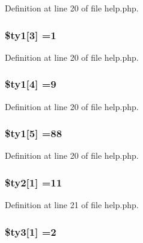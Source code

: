 Definition at line 20 of file help.\+php.

\hypertarget{help_8php_ad18d4358b281e06cd618cfb90f9d8fe3}{
\subsubsection[{\$ty1}]{\setlength{\rightskip}{0pt plus 5cm}\$ty1\mbox{[}3\mbox{]} =1}}\label{help_8php_ad18d4358b281e06cd618cfb90f9d8fe3}


Definition at line 20 of file help.\+php.

\hypertarget{help_8php_af76e33f9212a07c65cf094d63e549fad}{
\subsubsection[{\$ty1}]{\setlength{\rightskip}{0pt plus 5cm}\$ty1\mbox{[}4\mbox{]} =9}}\label{help_8php_af76e33f9212a07c65cf094d63e549fad}


Definition at line 20 of file help.\+php.

\hypertarget{help_8php_a2051398f6d528e7c7b22d89a4c2ae2f3}{
\subsubsection[{\$ty1}]{\setlength{\rightskip}{0pt plus 5cm}\$ty1\mbox{[}5\mbox{]} =88}}\label{help_8php_a2051398f6d528e7c7b22d89a4c2ae2f3}


Definition at line 20 of file help.\+php.

\hypertarget{help_8php_ac8b6921c3d88fe34ad63434936e52e6e}{
\subsubsection[{\$ty2}]{\setlength{\rightskip}{0pt plus 5cm}\$ty2\mbox{[}1\mbox{]} =11}}\label{help_8php_ac8b6921c3d88fe34ad63434936e52e6e}


Definition at line 21 of file help.\+php.

\hypertarget{help_8php_a79fba54c84cf5e4b2c89acc1f48ca463}{
\subsubsection[{\$ty3}]{\setlength{\rightskip}{0pt plus 5cm}\$ty3\mbox{[}1\mbox{]} =2}}\label{help_8php_a79fba54c84cf5e4b2c89acc1f48ca463}


